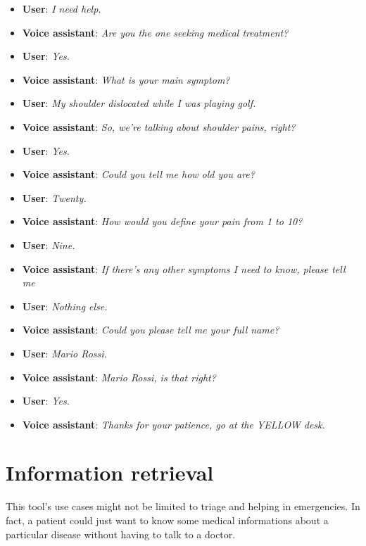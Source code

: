 \documentclass[conference]{IEEEtran}
\begin{document}
\begin{itemize}
    \item \textbf{User}: \textit{I need help.}
    \item \textbf{Voice assistant}: \textit{Are you the one seeking medical treatment?}
    \item \textbf{User}: \textit{Yes.}
    \item \textbf{Voice assistant}: \textit{What is your main symptom?}
    \item \textbf{User}: \textit{My shoulder dislocated while I was playing golf.}
    \item \textbf{Voice assistant}: \textit{So, we're talking about shoulder pains, right?}
    \item \textbf{User}: \textit{Yes.}
    \item \textbf{Voice assistant}: \textit{Could you tell me how old you are?}
    \item \textbf{User}: \textit{Twenty.}
    \item \textbf{Voice assistant}: \textit{How would you define your pain from 1 to 10?}
    \item \textbf{User}: \textit{Nine.}
    \item \textbf{Voice assistant}: \textit{If there's any other symptoms I need to know, please tell me}
    \item \textbf{User}: \textit{Nothing else.}
    \item \textbf{Voice assistant}: \textit{Could you please tell me your full name?}
    \item \textbf{User}: \textit{Mario Rossi.}
    \item \textbf{Voice assistant}: \textit{Mario Rossi, is that right?}
    \item \textbf{User}: \textit{Yes.}
    \item \textbf{Voice assistant}: \textit{Thanks for your patience, go at the YELLOW desk.}
\end{itemize}
\section{Information retrieval}
\label{sec:information-retrieval}
This tool's use cases might not be limited to triage and helping in emergencies. In fact, a patient could just want to know some medical informations about a particular disease without having to talk to a doctor.
\end{document}
